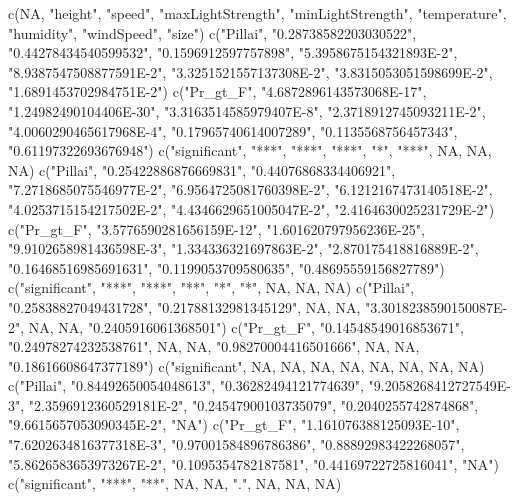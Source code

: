 c(NA, "height", "speed", "maxLightStrength", "minLightStrength", "temperature", "humidity", "windSpeed", "size")
c("Pillai", "0.28738582203030522", "0.44278434540599532", "0.1596912597757898", "5.3958675154321893E-2", "8.9387547508877591E-2", "3.3251521557137308E-2", "3.8315053051598699E-2", "1.6891453702984751E-2")
c("Pr_gt_F", "4.6872896143573068E-17", "1.24982490104406E-30", "3.3163514585979407E-8", "2.3718912745093211E-2", "4.0060290465617968E-4", "0.17965740614007289", "0.1135568756457343", "0.61197322693676948")
c("significant", "***", "***", "***", "*", "***", NA, NA, NA)
c("Pillai", "0.25422886876669831", "0.44076868334406921", "7.2718685075546977E-2", "6.9564725081760398E-2", "6.1212167473140518E-2", "4.0253715154217502E-2", "4.4346629651005047E-2", "2.4164630025231729E-2")
c("Pr_gt_F", "3.5776590281656159E-12", "1.601620797956236E-25", "9.9102658981436598E-3", "1.334336321697863E-2", "2.870175418816889E-2", "0.16468516985691631", "0.1199053709580635", "0.48695559156827789")
c("significant", "***", "***", "**", "*", "*", NA, NA, NA)
c("Pillai", "0.25838827049431728", "0.21788132981345129", NA, NA, "3.3018238590150087E-2", NA, NA, "0.2405916061368501")
c("Pr_gt_F", "0.14548549016853671", "0.24978274232538761", NA, NA, "0.98270004416501666", NA, NA, "0.18616608647377189")
c("significant", NA, NA, NA, NA, NA, NA, NA, NA)
c("Pillai", "0.84492650054048613", "0.36282494121774639", "9.2058268412727549E-3", "2.3596912360529181E-2", "0.24547900103735079", "0.2040255742874868", "9.6615657053090345E-2", "NA")
c("Pr_gt_F", "1.161076388125093E-10", "7.6202634816377318E-3", "0.97001584896786386", "0.88892983422268057", "5.8626583653973267E-2", "0.1095354782187581", "0.44169722725816041", "NA")
c("significant", "***", "**", NA, NA, ".", NA, NA, NA)
